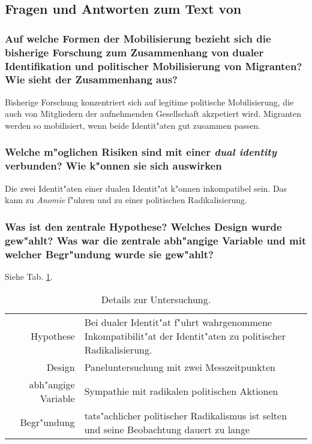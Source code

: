 \subsection{Fragen und Antworten zum Text von \textcite{simon_when_2013}}
\subsubsection{Auf welche Formen der Mobilisierung bezieht sich die bisherige Forschung zum Zusammenhang von dualer Identifikation und politischer Mobilisierung von Migranten? Wie sieht der Zusammenhang aus?}
Bisherige Forschung konzentriert sich auf legitime politische Mobilisierung, die auch von Mitgliedern der aufnehmenden Gesellschaft akzpetiert wird. Migranten werden so mobilisiert, wenn beide Identit"aten gut zusammen passen.

\subsubsection{Welche m"oglichen Risiken sind mit einer \emph{dual identity} verbunden? Wie k"onnen sie sich auswirken}
Die zwei Identit"aten einer dualen Identit"at k"onnen inkompatibel sein. Das kann zu \emph{Anomie} f"uhren und zu einer politischen Radikalisierung.

\subsubsection{Was ist den zentrale Hypothese? Welches Design wurde gew"ahlt? Was war die zentrale abh"angige Variable und mit welcher Begr"undung wurde sie gew"ahlt?}
Siehe Tab. \ref{tab:simon}.
\begin{table}[h!]
        \centering
        \begin{tabular}{r p{10cm}}
                \hline
                Hypothese & Bei dualer Identit"at f"uhrt wahrgenommene Inkompatibilit"at der Identit"aten zu politischer Radikalisierung.\\
                Design & Paneluntersuchung mit zwei Messzeitpunkten\\
                abh"angige Variable & Sympathie mit radikalen politischen Aktionen\\
                Begr"undung & tats"achlicher politischer Radikalismus ist selten und seine Beobachtung dauert zu lange\\
                \hline
        \end{tabular}
        \caption{Details zur Untersuchung.}
        \label{tab:simon}
\end{table}

